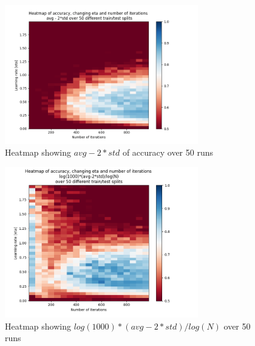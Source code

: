 \documentclass{article}
\begin{document}
\begin{figure}[h]
    \centering
    \includegraphics[width=0.75\textwidth]{05_backprop/indep50avgstd.png}
    \caption{Heatmap showing \(avg - 2*std\) of accuracy over 50 runs}
    \label{fig:indep50avgstd}
\end{figure}
\begin{figure}[h]
    \centering
    \includegraphics[width=0.75\textwidth]{05_backprop/indep50log.png}
    \caption{Heatmap showing \(log(1000)*(avg-2*std)/log(N)\) over 50 runs}
    \label{fig:indep50log}
\end{figure}
\\
\end{document}
